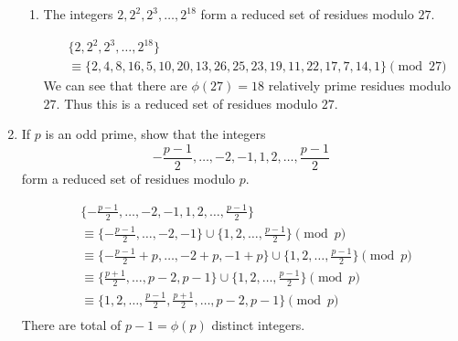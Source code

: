 \documentclass[12pt]{exam}
\theoremstyle{definition}
\begin{document}
\begin{enumerate}
\begin{enumerate}
                  \item The integers $2, 2^2, 2^3, \dots, 2^{18}$ form a reduced set of residues modulo $27$.

                        \begin{answer}
                              \[
                                    \begin{aligned}
                                          &\{2, 2^2, 2^3, \dots, 2^{18}\} \\
                                          &\equiv \{2, 4, 8, 16, 5, 10, 20, 13, 26, 25, 23, 19, 11, 22, 17, 7, 14, 1\} \pmod{27}
                                    \end{aligned}
                              \]
                              We can see that there are $\phi(27) = 18$ relatively prime residues modulo $27$. 
                              Thus this is a reduced set of residues modulo $27$.
                        \end{answer}

            \end{enumerate}
      \item If $p$ is an odd prime, show that the integers
            \[
                  -\frac{p-1}{2}, \dots, -2, -1, 1, 2, \dots, \frac{p-1}{2}
            \]
            form a reduced set of residues modulo $p$.

            \begin{answer}
                  \[
                        \begin{aligned}
                              &\{-\frac{p-1}{2}, \dots, -2, -1, 1, 2, \dots, \frac{p-1}{2}\} \\
                              &\equiv \{-\frac{p-1}{2}, \dots, -2, -1\} \cup \{1, 2, \dots, \frac{p-1}{2}\} \pmod{p} \\
                              &\equiv \{-\frac{p-1}{2} + p, \dots, -2 + p, -1 + p\} \cup \{1, 2, \dots, \frac{p-1}{2}\} \pmod{p} \\ 
                              &\equiv \{\frac{p+1}{2}, \dots, p - 2, p - 1\} \cup \{1, 2, \dots, \frac{p-1}{2}\} \pmod{p} \\
                              &\equiv \{1, 2, \dots, \frac{p-1}{2}, \frac{p+1}{2}, \dots, p - 2, p - 1\} \pmod{p} \\
                        \end{aligned}
                  \]
                  There are total of $p - 1 = \phi(p)$ distinct integers.
            \end{answer}

\end{enumerate}
\end{document}
